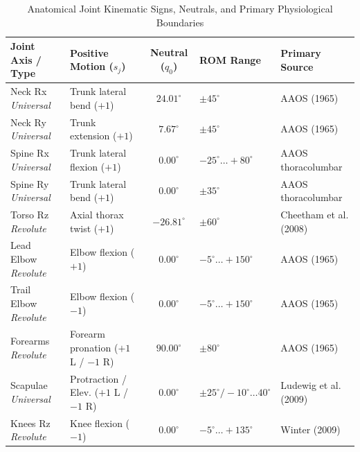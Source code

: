 \documentclass[11pt,a4paper]{article}
\begin{document}
\begin{table}[!htb]
\centering
\footnotesize
\caption{Anatomical Joint Kinematic Signs, Neutrals, and Primary Physiological Boundaries}
\label{tab:joint_signs}
\begin{tabularx}{\textwidth}{p{2.6cm} >{\raggedright\arraybackslash}X c p{3.4cm} >{\raggedright\arraybackslash}X}
\toprule
\textbf{Joint Axis / Type} & \textbf{Positive Motion ($s_j$)} & \textbf{Neutral ($q_0$)} & \textbf{ROM Range} & \textbf{Primary Source} \\
\midrule
Neck Rx \newline \textit{Universal} & Trunk lateral bend ($+1$) & $24.01^\circ$ & $\pm 45^\circ$ & AAOS (1965) \\
\addlinespace[2pt]
Neck Ry \newline \textit{Universal} & Trunk extension ($+1$) & $7.67^\circ$ & $\pm 45^\circ$ & AAOS (1965) \\
\addlinespace[2pt]
Spine Rx \newline \textit{Universal} & Trunk lateral flexion ($+1$) & $0.00^\circ$ & $-25^\circ \dots +80^\circ$ & AAOS thoracolumbar \\
\addlinespace[2pt]
Spine Ry \newline \textit{Universal} & Trunk lateral bend ($+1$) & $0.00^\circ$ & $\pm 35^\circ$ & AAOS thoracolumbar \\
\addlinespace[2pt]
Torso Rz \newline \textit{Revolute} & Axial thorax twist ($+1$) & $-26.81^\circ$ & $\pm 60^\circ$ & Cheetham et al. (2008) \\
\addlinespace[2pt]
Lead Elbow \newline \textit{Revolute} & Elbow flexion ($+1$) & $0.00^\circ$ & $-5^\circ \dots +150^\circ$ & AAOS (1965) \\
\addlinespace[2pt]
Trail Elbow \newline \textit{Revolute} & Elbow flexion ($-1$) & $0.00^\circ$ & $-5^\circ \dots +150^\circ$ & AAOS (1965) \\
\addlinespace[2pt]
Forearms \newline \textit{Revolute} & Forearm pronation ($+1$ L / $-1$ R) & $90.00^\circ$ & $\pm 80^\circ$ & AAOS (1965) \\
\addlinespace[2pt]
Scapulae \newline \textit{Universal} & Protraction / Elev. ($+1$ L / $-1$ R) & $0.00^\circ$ & $\pm 25^\circ / -10^\circ \dots 40^\circ$ & Ludewig et al. (2009) \\
\addlinespace[2pt]
Knees Rz \newline \textit{Revolute} & Knee flexion ($-1$) & $0.00^\circ$ & $-5^\circ \dots +135^\circ$ & Winter (2009) \\

\end{tabularx}
\end{table}
\end{document}
